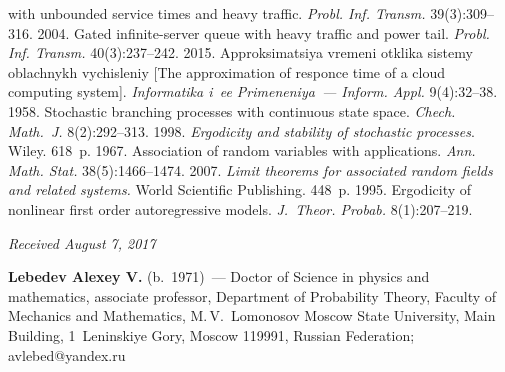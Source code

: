 \begin{multicols}{2}
{{\begin{thebibliography}{99}
with unbounded service times and
heavy traffic. \textit{Probl. Inf. Transm.} 39(3):309--316.
 2004. Gated infinite-server queue with heavy traffic and power tail.
\textit{Probl. Inf. Transm.} 40(3):237--242.
 2015.
Approksimatsiya vremeni otklika sistemy oblachnykh vychisleniy
[The approximation of responce time of a cloud computing system]. \textit{Informatika i~ee
Primeneniya~--- Inform. Appl.} 9(4):32--38.
 1958. Stochastic branching processes with continuous
state space. \textit{Chech. Math.~J.} 8(2):292--313.
 1998. \textit{Ergodicity and stability of stochastic processes}. Wiley. 618~p.
 1967. Association of random variables
with applications. \textit{Ann. Math. Stat.} 38(5):1466--1474.
 2007. \textit{Limit theorems for associated random fields
and related systems.} World Scientific Publishing. 448~p.
 1995. Ergodicity of nonlinear first order
autoregressive models. \textit{J.~Theor. Probab.} 8(1):207--219.
\end{thebibliography}

 }
 }

\end{multicols}

\vspace*{-3pt}

\hfill{\small\textit{Received August 7, 2017}}


\Contrl

\noindent
\textbf{Lebedev Alexey V.} (b.\ 1971)~--- Doctor of Science in physics and mathematics,
associate professor, Department of Probability Theory, Faculty of Mechanics 
and Mathematics,
M.\,V.~Lomonosov Moscow State University, Main Building, 1~Leninskiye Gory,
Moscow 119991, Russian Federation; \mbox{avlebed@yandex.ru}
\label{end\stat}


\renewcommand{\bibname}{\protect\rm Литература} 